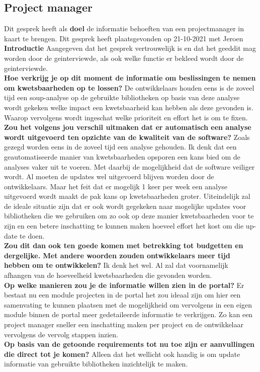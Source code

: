 \subsection{Project manager}\label{subsec:project-manager}
Dit gesprek heeft als \textbf{doel} de informatie behoeften van een projectmanager in kaart te brengen. Dit gesprek heeft plaatsgevonden op 21-10-2021 met Jeroen
\\
\textbf{Introductie }
Aangegeven dat het gesprek vertrouwelijk is en dat het ge\-eddit mag worden door de geinterviewde, als ook welke functie er bekleed wordt door de geinterviewde.
\\
\textbf{Hoe verkrijg je op dit moment de informatie om beslissingen te nemen om kwetsbaarheden op te lossen? }
De ontwikkelaars houden eens is de zoveel tijd een soup-analyse op de gebruikte bibliotheken op basis van deze analyse wordt gekeken welke impact een kwetsbaarheid kan hebben als deze gevonden is. Waarop vervolgens wordt ingeschat welke prioriteit en effort het is om te fixen.
\\
\textbf{Zou het volgens jou verschil uitmaken dat er automatisch een analyse wordt uitgevoerd ten opzichte van de kwaliteit van de software? }Zoals gezegd worden eens in de zoveel tijd een analyse gehouden. Ik denk dat een geautomatiseerde manier van kwetsbaarheden opsporen een kans bied om de analyses vaker uit te voeren. Met daarbij de mogelijkheid dat de software veiliger wordt. Al moeten de updates wel uitgevoerd blijven worden door de ontwikkelaars. Maar het feit dat er mogelijk 1 keer per week een analyse uitgevoerd wordt maakt de pak kans op kwetsbaarheden groter. Uiteindelijk zal de ideale situatie zijn dat er ook wordt gegekeken naar mogelijke updates voor bibliotheken die we gebruiken om zo ook op deze manier kwetsbaarheden voor te zijn en een betere inschatting te kunnen maken hoeveel effort het kost om die up-date te doen.
\\

\textbf{Zou dit dan ook ten goede komen met betrekking tot budgetten en dergelijke. Met andere woorden zouden ontwikkelaars meer tijd hebben om te ontwikkelen?} Ik denk het wel. Al zal dat voornamelijk afhangen van de hoeveelheid kwetsbaarheden die gevonden worden.
\\
\textbf{Op welke manieren zou je de informatie willen zien in de portal?} Er bestaat nu een module projecten in de portal het zou ideaal zijn om hier een samenvating te kunnen plaatsen met de mogelijkheid om vervolgens in een eigen module binnen de portal meer gedetaileerde informatie te verkrijgen. Zo kan een project manager sneller een inschatting maken per project en de ontwikkelaar vervolgens de vervolg stappen inzien.
\\
\textbf{Op basis van de getoonde requirements tot nu toe zijn er aanvullingen die direct tot je komen?} Alleen dat het wellicht ook handig is om update informatie van gebruikte bibliotheken inzichtelijk te maken.
